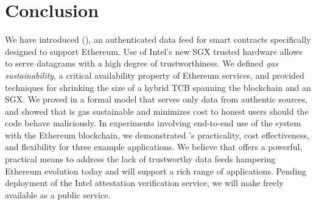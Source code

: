 \section{Conclusion}
\label{sec:conclude}

We have introduced \tcs (\tc), an authenticated data feed for smart contracts specifically designed to support Ethereum.
Use of Intel's new SGX trusted hardware allows \tc to serve datagrams with a high degree of trustworthiness.
We defined \emph{gas sustainability}, a critical availability property of Ethereum services,
and provided techniques for shrinking the size of a hybrid TCB spanning the blockchain and an SGX.
We proved in a formal model that \tc serves only data from authentic sources,
and showed that \tc is gas sustainable and minimizes cost to honest users should the code behave maliciously.
In experiments involving end-to-end use of the system with the Ethereum blockchain, we demonstrated \tc's practicality, cost effectiveness, and flexibility for three example applications.
We believe that \tc offers a powerful, practical means to address the lack of trustworthy data feeds hampering Ethereum evolution today and will support a rich range of applications.
Pending deployment of the Intel attestation verification service, we will make \tc freely available as a public service.

